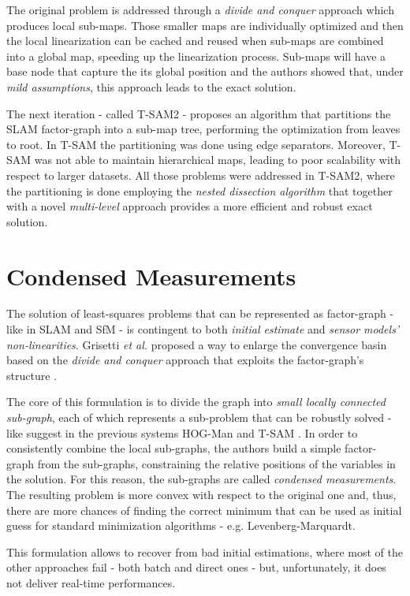 The original problem is addressed through a \textit{divide and conquer} approach which produces local sub-maps. Those smaller maps are individually optimized and then the local linearization can be cached and reused when sub-maps are combined into a global map, speeding up the linearization process. Sub-maps will have a base node that capture the its global position and the authors showed that, under \textit{mild assumptions}, this approach leads to the exact solution. 

The next iteration - called T-SAM2 \cite{ni2010nestedDiss} - proposes an algorithm that partitions the SLAM factor-graph into a sub-map tree, performing the optimization from leaves to root. In T-SAM the partitioning was done using edge separators. Moreover, T-SAM was not able to maintain hierarchical maps, leading to poor scalability with respect to larger datasets. All those problems were addressed in T-SAM2, where the partitioning is done employing the \textit{nested dissection algorithm} that together with a novel \textit{multi-level} approach provides a more efficient and robust exact solution.

\section{Condensed Measurements}\label{sec:cmeas}
The solution of least-squares problems that can be represented as factor-graph - like in SLAM and SfM - is contingent to both \textit{initial estimate} and \textit{sensor models' non-linearities}. Grisetti \textit{et al.} proposed a way to enlarge the convergence basin based on the \textit{divide and conquer} approach that exploits the factor-graph's structure \cite{grisetti2012condensed}. 

The core of this formulation is to divide the graph into \textit{small locally connected sub-graph}, each of which represents a sub-problem that can be robustly solved - like suggest in the previous systems HOG-Man \cite{grisetti2010hogman} and T-SAM \cite{ni2010nestedDiss}. In order to consistently combine the local sub-graphs, the authors build a simple factor-graph from the sub-graphs, constraining the relative positions of the variables in the solution. For this reason, the sub-graphs are called \textit{condensed measurements}. The resulting problem is more convex with respect to the original one and, thus, there are more chances of finding the correct minimum that can be used as initial guess for standard minimization algorithms - e.g. Levenberg-Marquardt.

This formulation allows to recover from bad initial estimations, where most of the other approaches fail - both batch and direct ones - but, unfortunately, it does not deliver real-time performances.

